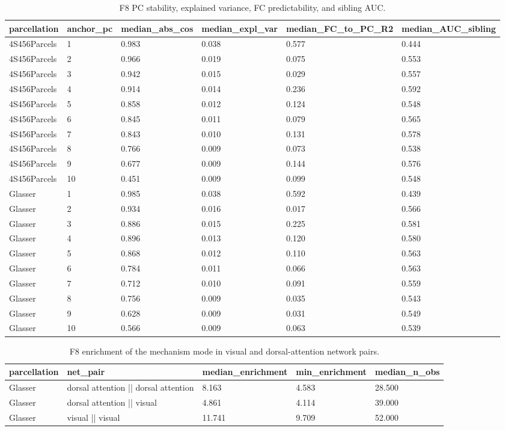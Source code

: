 \documentclass{article}
\begin{document}
\begin{table}[H]
\centering
\scriptsize
\caption{F8 PC stability, explained variance, FC predictability, and sibling AUC.}
\label{tab:f8pcs}
\begin{tabular}{llllll}
\toprule
parcellation & anchor\_pc & median\_abs\_cos & median\_expl\_var & median\_FC\_to\_PC\_R2 & median\_AUC\_sibling \\
\midrule
4S456Parcels & 1 & 0.983 & 0.038 & 0.577 & 0.444 \\
4S456Parcels & 2 & 0.966 & 0.019 & 0.075 & 0.553 \\
4S456Parcels & 3 & 0.942 & 0.015 & 0.029 & 0.557 \\
4S456Parcels & 4 & 0.914 & 0.014 & 0.236 & 0.592 \\
4S456Parcels & 5 & 0.858 & 0.012 & 0.124 & 0.548 \\
4S456Parcels & 6 & 0.845 & 0.011 & 0.079 & 0.565 \\
4S456Parcels & 7 & 0.843 & 0.010 & 0.131 & 0.578 \\
4S456Parcels & 8 & 0.766 & 0.009 & 0.073 & 0.538 \\
4S456Parcels & 9 & 0.677 & 0.009 & 0.144 & 0.576 \\
4S456Parcels & 10 & 0.451 & 0.009 & 0.099 & 0.548 \\
Glasser & 1 & 0.985 & 0.038 & 0.592 & 0.439 \\
Glasser & 2 & 0.934 & 0.016 & 0.017 & 0.566 \\
Glasser & 3 & 0.886 & 0.015 & 0.225 & 0.581 \\
Glasser & 4 & 0.896 & 0.013 & 0.120 & 0.580 \\
Glasser & 5 & 0.868 & 0.012 & 0.110 & 0.563 \\
Glasser & 6 & 0.784 & 0.011 & 0.066 & 0.563 \\
Glasser & 7 & 0.712 & 0.010 & 0.091 & 0.559 \\
Glasser & 8 & 0.756 & 0.009 & 0.035 & 0.543 \\
Glasser & 9 & 0.628 & 0.009 & 0.031 & 0.549 \\
Glasser & 10 & 0.566 & 0.009 & 0.063 & 0.539 \\
\bottomrule
\end{tabular}
\end{table}

\begin{table}[H]
\centering
\scriptsize
\caption{F8 enrichment of the mechanism mode in visual and dorsal-attention network pairs.}
\label{tab:f8enrich}
\begin{tabular}{lllll}
\toprule
parcellation & net\_pair & median\_enrichment & min\_enrichment & median\_n\_obs \\
\midrule
Glasser & dorsal attention || dorsal attention & 8.163 & 4.583 & 28.500 \\
Glasser & dorsal attention || visual & 4.861 & 4.114 & 39.000 \\
Glasser & visual || visual & 11.741 & 9.709 & 52.000 \\
\bottomrule
\end{tabular}
\end{table}
\end{document}
